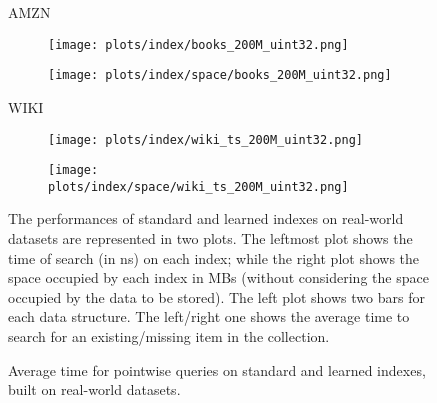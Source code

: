 \documentclass{article}
\begin{document}
\begin{figure}[!htbp]
{\begin{minipage}[t][0.98\textheight][t]{\textwidth}
    \begin{minipage}{0.05\linewidth}
    \begin{sideways}\small AMZN\end{sideways}
    \end{minipage}
    \begin{minipage}{0.3\linewidth}
        \begin{figure}[H]
        \texttt{[image: plots/index/books\_200M\_uint32.png]}
        \end{figure}
    \end{minipage}
    \begin{minipage}{0.3\linewidth}
        \begin{figure}[H]
            \texttt{[image: plots/index/space/books\_200M\_uint32.png]}
        \end{figure}
    \end{minipage}
    \vspace*{-20px}

    \begin{minipage}{0.05\linewidth}
    \begin{sideways}\small WIKI\end{sideways}
    \end{minipage}
    \begin{minipage}{0.3\linewidth}
        \begin{figure}[H]
        \texttt{[image: plots/index/wiki\_ts\_200M\_uint32.png]}
        \end{figure}
    \end{minipage}
    \begin{minipage}{0.3\linewidth}
        \begin{figure}[H]
            \texttt{[image: plots/index/space/wiki\_ts\_200M\_uint32.png]}
        \end{figure}
    \end{minipage}

    \vfill
    
    \centering
    \begin{minipage}{\linewidth}
        The performances of standard and learned indexes on real-world datasets are represented in two plots. The leftmost plot shows the time of search (in ns) on each index; while the right plot shows the space occupied by each index in MBs (without considering the space occupied by the data to be stored). The left plot shows two bars for each data structure. The left/right one shows the average time to search for an existing/missing item in the collection.
    \end{minipage}
    \vspace{10px}
\end{minipage}
}
\caption{Average time for pointwise queries on standard and learned indexes, built on real-world datasets.}
\end{figure}
\end{document}
